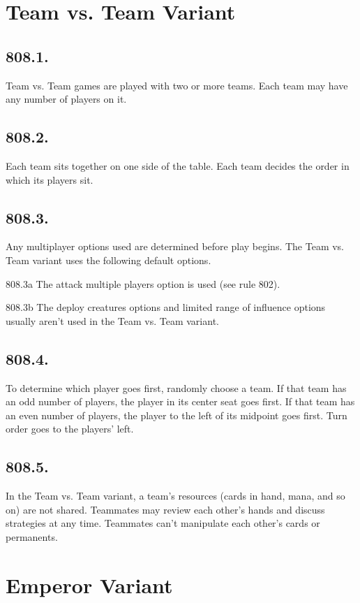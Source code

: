 \section{Team vs. Team Variant}
\subsection*{808.1.}
Team vs. Team games are played with two or more teams. Each team may have any number of players on it.

\subsection*{808.2.}
Each team sits together on one side of the table. Each team decides the order in which its players sit.

\subsection*{808.3.}
Any multiplayer options used are determined before play begins. The Team vs. Team variant uses the following default options.

808.3a The attack multiple players option is used (see rule 802).

808.3b The deploy creatures options and limited range of influence options usually aren’t used in the Team vs. Team variant.

\subsection*{808.4.}
To determine which player goes first, randomly choose a team. If that team has an odd number of players, the player in its center seat goes first. If that team has an even number of players, the player to the left of its midpoint goes first. Turn order goes to the players’ left.

\subsection*{808.5.}
In the Team vs. Team variant, a team’s resources (cards in hand, mana, and so on) are not shared. Teammates may review each other’s hands and discuss strategies at any time. Teammates can’t manipulate each other’s cards or permanents.

\section{Emperor Variant}
